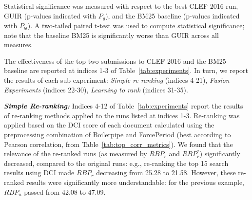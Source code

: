 Statistical significance was measured with respect to the best CLEF 2016 run, GUIR (p-values indicated with $P_g$), and the BM25 baseline (p-values indicated with $P_{bl}$). A two-tailed paired t-test was used to compute statistical significance; note that the baseline BM25 is significantly worse than GUIR across all measures.
 

The effectiveness of the top two submissions to CLEF 2016 and the BM25 baseline are reported at indices 1-3 of Table~\ref{tab:experiments}. 
In turn, we report the results of each sub-experiment: \textit{Simple re-ranking} (indices 4-21), \textit{Fusion Experiments} (indices 22-30), \textit{Learning to rank} (indices 31-35).



\textbf{\textit{Simple Re-ranking:}} Indices 4-12 of Table~\ref{tab:experiments} report the results of re-ranking methods applied to the runs listed at indices 1-3. Re-ranking was applied based on the DCI score of each document calculated using the preprocessing combination of Boilerpipe and ForcePeriod (best according to Pearson correlation, from Table~\ref{tab:top_corr_metrics}).
We found that the relevance of the re-ranked runs (as measured by $RBP_r$ and $RBP_r^*$) significantly decreased, compared to the original runs: e.g., re-ranking the top 15 search results using DCI  made $RBP_r$ decreasing from 25.28 to 21.58. However, these re-ranked results were significantly more understandable: for the previous example, $RBP_u$ passed from 42.08 to 47.09.

